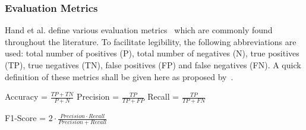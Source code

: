 \subsubsection{Evaluation Metrics}
Hand et al\@. define various evaluation metrics~\citep{hand2021f} which are commonly found throughout the literature. To facilitate legibility, the following abbreviations are used: total number of positives (P), total number of negatives (N), true positives (TP), true negatives (TN), false positives (FP) and false negatives (FN). A quick definition of these metrics shall be given here as proposed by~\cite{hand2021f}. 

\begin{center}
	Accuracy = $\frac{TP + TN}{P + N}$ \hspace{4em} Precision = $\frac{TP}{TP + FP}$ \hspace{4em} Recall = $\frac{TP}{TP + FN}$ \newline
\end{center}
\begin{center}
	F1-Score = $2 \cdot \frac{Precision \cdot Recall}{Precision + Recall}$
\end{center}